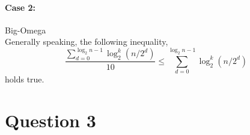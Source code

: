 \documentclass{article}
\begin{document}
\paragraph{Case 2:} Big-Omega\\
Generally speaking, the following inequality,
$$  \frac{\sum^{\log_2 n -1}_{d=0}\log_2^k (n/2^d)}{10} \leq  \sum^{\log_2 n -1}_{d=0}\log_2^k (n/2^d)$$
holds true.









\section*{Question 3}
\end{document}
